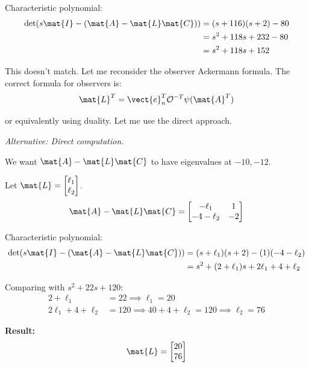Characteristic polynomial:
\begin{align}
\det(s\mat{I} - (\mat{A} - \mat{L}\mat{C})) &= (s+116)(s+2) - 80 \nonumber \\
&= s^2 + 118s + 232 - 80 \nonumber \\
&= s^2 + 118s + 152
\end{align}

This doesn't match. Let me reconsider the observer Ackermann formula. The correct formula for observers is:
\begin{equation}
\mat{L}^T = \vect{e}_n^T\mathcal{O}^{-T}\psi(\mat{A}^T)
\end{equation}

or equivalently using duality. Let me use the direct approach.

\textit{Alternative: Direct computation.}

We want $\mat{A} - \mat{L}\mat{C}$ to have eigenvalues at $-10, -12$.

Let $\mat{L} = \begin{bmatrix} \ell_1 \\ \ell_2 \end{bmatrix}$.
\begin{equation}
\mat{A} - \mat{L}\mat{C} = \begin{bmatrix} -\ell_1 & 1 \\ -4-\ell_2 & -2 \end{bmatrix}
\end{equation}

Characteristic polynomial:
\begin{align}
\det(s\mat{I} - (\mat{A} - \mat{L}\mat{C})) &= (s+\ell_1)(s+2) - (1)(-4-\ell_2) \nonumber \\
&= s^2 + (2+\ell_1)s + 2\ell_1 + 4 + \ell_2
\end{align}

Comparing with $s^2 + 22s + 120$:
\begin{align}
2 + \ell_1 &= 22 \implies \ell_1 = 20 \\
2\ell_1 + 4 + \ell_2 &= 120 \implies 40 + 4 + \ell_2 = 120 \implies \ell_2 = 76
\end{align}

\textbf{Result:}
\begin{equation}
\mat{L} = \begin{bmatrix} 20 \\ 76 \end{bmatrix}
\end{equation}

